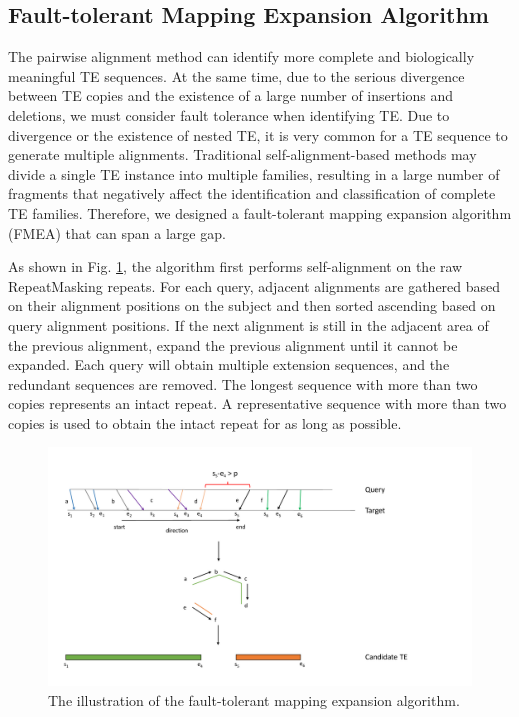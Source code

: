 \documentclass{bmcart}
\begin{document}
\subsection*{Fault-tolerant Mapping Expansion Algorithm}
The pairwise alignment method can identify more complete and biologically meaningful TE sequences. At the same time, due to the serious divergence between TE copies and the existence of a large number of insertions and deletions, we must consider fault tolerance when identifying TE. Due to divergence or the existence of nested TE, it is very common for a TE sequence to generate multiple alignments. Traditional self-alignment-based methods may divide a single TE instance into multiple families, resulting in a large number of fragments that negatively affect the identification and classification of complete TE families. Therefore, we designed a fault-tolerant mapping expansion algorithm (FMEA) that can span a large gap.

As shown in Fig. \ref{fig:fmea}, the algorithm first performs self-alignment on the raw RepeatMasking repeats. For each query, adjacent alignments are gathered based on their alignment positions on the subject and then sorted ascending based on query alignment positions. If the next alignment is still in the adjacent area of the previous alignment, expand the previous alignment until it cannot be expanded. Each query will obtain multiple extension sequences, and the redundant sequences are removed. The longest sequence with more than two copies represents an intact repeat. A representative sequence with more than two copies is used to obtain the intact repeat for as long as possible.

\begin{figure}[h!]
	\centerline{\includegraphics[width=1.0\textwidth]{figures/FMEA.pdf}}
	\caption{The illustration of the fault-tolerant mapping expansion algorithm.}
	\label{fig:fmea}
\end{figure}
\end{document}
